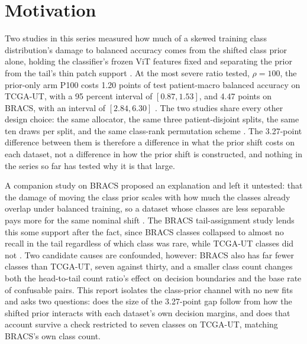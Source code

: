 \documentclass[11pt]{article}
\begin{document}
\section{Motivation}
\label{sec:motivation}
Two studies in this series measured how much of a skewed training class distribution's damage to balanced accuracy comes from the shifted class prior alone, holding the classifier's frozen ViT features fixed and separating the prior from the tail's thin patch support \citep{queisler2026causeTcga, queisler2026causeBracs}. At the most severe ratio tested, $\rho=100$, the prior-only arm P100 costs 1.20 points of test patient-macro balanced accuracy on TCGA-UT, with a 95 percent interval of $[0.87, 1.53]$, and 4.47 points on BRACS, with an interval of $[2.84, 6.30]$ \citep{queisler2026causeTcga, queisler2026causeBracs}. The two studies share every other design choice: the same allocator, the same three patient-disjoint splits, the same ten draws per split, and the same class-rank permutation scheme \citep{queisler2026prevalenceTcga, queisler2026prevalenceBracs}. The 3.27-point difference between them is therefore a difference in what the prior shift costs on each dataset, not a difference in how the prior shift is constructed, and nothing in the series so far has tested why it is that large.

A companion study on BRACS proposed an explanation and left it untested: that the damage of moving the class prior scales with how much the classes already overlap under balanced training, so a dataset whose classes are less separable pays more for the same nominal shift \citep{queisler2026prevalenceBracs}. The BRACS tail-assignment study lends this some support after the fact, since BRACS classes collapsed to almost no recall in the tail regardless of which class was rare, while TCGA-UT classes did not \citep{queisler2026tailBracs, queisler2026tailTcga}. Two candidate causes are confounded, however: BRACS also has far fewer classes than TCGA-UT, seven against thirty, and a smaller class count changes both the head-to-tail count ratio's effect on decision boundaries and the base rate of confusable pairs. This report isolates the class-prior channel with no new fits and asks two questions: does the size of the 3.27-point gap follow from how the shifted prior interacts with each dataset's own decision margins, and does that account survive a check restricted to seven classes on TCGA-UT, matching BRACS's own class count.
\end{document}
